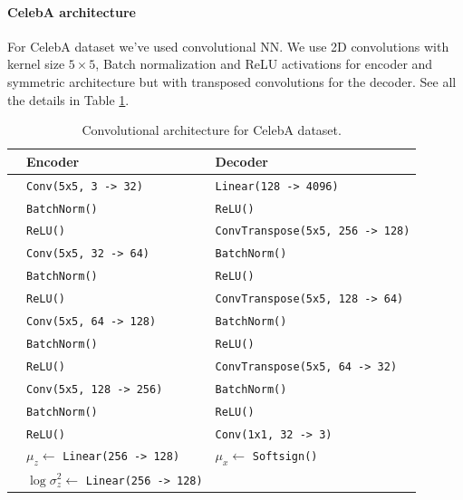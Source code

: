 \paragraph{CelebA architecture} For CelebA dataset we've used convolutional NN. We use 2D convolutions with kernel size $5\times 5$, Batch normalization and ReLU activations for encoder and symmetric architecture but with transposed convolutions for the decoder. See all the details in Table \ref{tab:celeba_arc}.

\begin{table}[ht]
\begin{center}
\caption{Convolutional architecture for CelebA dataset.}
\label{tab:celeba_arc}
\begin{tabular}{@{}lll@{}}
\toprule
                   & Encoder & Decoder  \\  \midrule
& \texttt{Conv(5x5, 3 -> 32)} & \texttt{Linear(128 -> 4096)} \\
& \texttt{BatchNorm()} &\texttt{ReLU()} \\
& \texttt{ReLU()} &\texttt{ConvTranspose(5x5, 256 -> 128)} \\
& \texttt{Conv(5x5, 32 -> 64)} & \texttt{BatchNorm()}\\
& \texttt{BatchNorm()} & \texttt{ReLU()}\\
& \texttt{ReLU()} & \texttt{ConvTranspose(5x5, 128 -> 64)}\\
& \texttt{Conv(5x5, 64 -> 128)} &\texttt{BatchNorm()} \\
& \texttt{BatchNorm()} & \texttt{ReLU()}\\
& \texttt{ReLU()} & \texttt{ConvTranspose(5x5, 64 -> 32)}\\
& \texttt{Conv(5x5, 128 -> 256)} & \texttt{BatchNorm()}\\
& \texttt{BatchNorm()} & \texttt{ReLU()}\\
& \texttt{ReLU()} & \texttt{Conv(1x1, 32 -> 3)}\\
& $\mu_z \leftarrow$  \texttt{Linear(256 -> 128)} & $\mu_x \leftarrow$  \texttt{Softsign()}  \\
& $\log \sigma^2_z \leftarrow$ \texttt{Linear(256 -> 128)}&\\ 
\bottomrule
\end{tabular}
\end{center}
\end{table}

